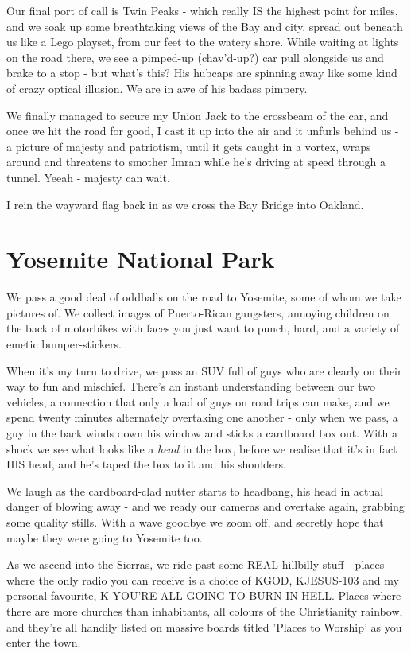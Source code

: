 \documentclass[a5paper,titlepage,draft]{book}
\begin{document}
Our final port of call is Twin Peaks - which really IS the highest point for miles, and we soak up some breathtaking views of the Bay and city, spread out beneath us like a Lego playset, from our feet to the watery shore.  While waiting at lights on the road there, we see a pimped-up (chav'd-up?) car pull alongside us and brake to a stop - but what's this?  His hubcaps are spinning away like some kind of crazy optical illusion.  We are in awe of his badass pimpery.

We finally managed to secure my Union Jack to the crossbeam of the car, and once we hit the road for good, I cast it up into the air and it unfurls behind us - a picture of majesty and patriotism, until it gets caught in a vortex, wraps around and threatens to smother Imran while he's driving at speed through a tunnel.  Yeeah - majesty can wait.

I rein the wayward flag back in as we cross the Bay Bridge into Oakland.

\section*{Yosemite National Park}
We pass a good deal of oddballs on the road to Yosemite, some of whom we take pictures of.  We collect images of Puerto-Rican gangsters, annoying children on the back of motorbikes with faces you just want to punch, hard, and a variety of emetic bumper-stickers.

When it's my turn to drive, we pass an SUV full of guys who are clearly on their way to fun and mischief.  There's an instant understanding between our two vehicles, a connection that only a load of guys on road trips can make, and we spend twenty minutes alternately overtaking one another - only when we pass, a guy in the back winds down his window and sticks a cardboard box out.  With a shock we see what looks like a \emph{head} in the box, before we realise that it's in fact HIS head, and he's taped the box to it and his shoulders.

We laugh as the cardboard-clad nutter starts to headbang, his head in actual danger of blowing away - and we ready our cameras and overtake again, grabbing some quality stills.  With a wave goodbye we zoom off, and secretly hope that maybe they were going to Yosemite too.

As we ascend into the Sierras, we ride past some REAL hillbilly stuff - places where the only radio you can receive is a choice of KGOD, KJESUS-103 and my personal favourite, K-YOU'RE ALL GOING TO BURN IN HELL.  Places where there are more churches than inhabitants, all colours of the Christianity rainbow, and they're all handily listed on massive boards titled 'Places to Worship' as you enter the town.
\end{document}
